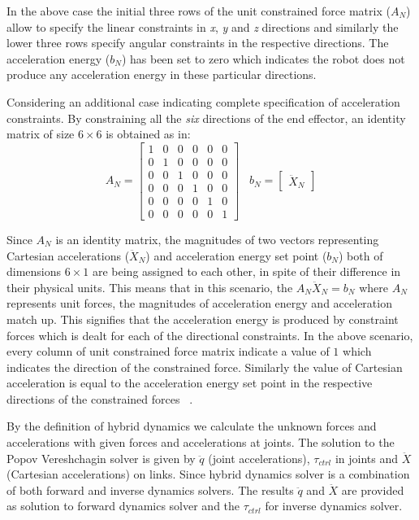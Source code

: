 \begin{itemize}
	
In the above case the initial three rows of the unit constrained force matrix ($A_{N}$) allow to specify the linear constraints in \textit{x}, \textit{y} and \textit{z} directions and similarly the lower three rows specify angular constraints in the respective directions. The acceleration energy ($b_{N}$) has been set to zero which indicates the robot does not produce any acceleration energy in these particular directions. 
	
	
Considering an additional case indicating complete specification of acceleration constraints. By constraining all the \textit{six} directions of the end effector, an identity matrix of size $6 \times 6$ is obtained as in: ~\cite{shakhimardanov2015composable}
	\[	A_{N} =
	\begin{bmatrix}
	1 & 0 & 0 & 0 & 0 & 0\\ 0 & 1 & 0 & 0 & 0 &0\\ 0 & 0 & 1 & 0 & 0 & 0\\ 0 & 0 & 0 & 1 & 0 & 0\\0 & 0 & 0 & 0 & 1 & 0\\ 0 & 0 & 0 & 0& 0 &1
	\end{bmatrix}  \;\;\;
	b_{N} =
	\begin{bmatrix}
	\ddot{X}_{N}
	\end{bmatrix}
	\]
	
	
Since $A_{N}$ is an identity matrix, the magnitudes of two vectors representing Cartesian accelerations ($\ddot{X}_{N}$) and acceleration energy set point ($b_{N}$) both of dimensions $6\times 1$ are being assigned to each other, in spite of their difference in their physical units. This means that in this scenario, the $A_{N}\ddot{X}_{N} = b_{N}$ where $A_{N}$ represents unit forces, the magnitudes of acceleration energy and acceleration match up. This signifies that the acceleration energy is produced by constraint forces which is dealt for each of the directional constraints. In the above scenario, every column of unit constrained force matrix indicate a value of $1$ which indicates the direction of the constrained force. Similarly the value of Cartesian acceleration is equal to the acceleration energy set point in the respective directions of the constrained forces ~\cite{vukcevic2018extending}.


By the definition of hybrid dynamics we calculate the unknown forces and accelerations with given forces and accelerations at joints. The solution to the Popov Vereshchagin solver is given by $\ddot{q}$ (joint accelerations), $\tau_{ctrl}$ in joints and $\ddot{X}$ (Cartesian accelerations) on links. Since hybrid dynamics solver is a combination of both forward and inverse dynamics solvers. The results $\ddot{q}$ and $\ddot{X}$ are provided as solution to forward dynamics solver and the $\tau_{ctrl}$ for inverse dynamics solver. 
\end{itemize}

